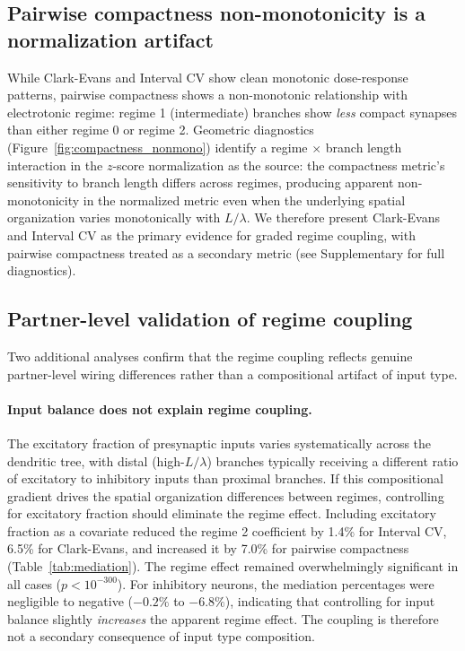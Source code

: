 \documentclass[11pt]{article}
\begin{document}
\subsection{Pairwise compactness non-monotonicity is a normalization artifact}
\label{sec:compactness}

While Clark-Evans and Interval CV show clean monotonic dose-response patterns, pairwise compactness shows a non-monotonic relationship with electrotonic regime: regime 1 (intermediate) branches show \textit{less} compact synapses than either regime 0 or regime 2. Geometric diagnostics (Figure~\ref{fig:compactness_nonmono}) identify a regime $\times$ branch length interaction in the $z$-score normalization as the source: the compactness metric's sensitivity to branch length differs across regimes, producing apparent non-monotonicity in the normalized metric even when the underlying spatial organization varies monotonically with $L/\lambda$. We therefore present Clark-Evans and Interval CV as the primary evidence for graded regime coupling, with pairwise compactness treated as a secondary metric (see Supplementary for full diagnostics).


\subsection{Partner-level validation of regime coupling}
\label{sec:partner_validation}

Two additional analyses confirm that the regime coupling reflects genuine partner-level wiring differences rather than a compositional artifact of input type.

\paragraph{Input balance does not explain regime coupling.} \label{sec:mediation_input} The excitatory fraction of presynaptic inputs varies systematically across the dendritic tree, with distal (high-$L/\lambda$) branches typically receiving a different ratio of excitatory to inhibitory inputs than proximal branches. If this compositional gradient drives the spatial organization differences between regimes, controlling for excitatory fraction should eliminate the regime effect. Including excitatory fraction as a covariate reduced the regime 2 coefficient by 1.4\% for Interval CV, 6.5\% for Clark-Evans, and increased it by 7.0\% for pairwise compactness (Table~\ref{tab:mediation}). The regime effect remained overwhelmingly significant in all cases ($p < 10^{-300}$). For inhibitory neurons, the mediation percentages were negligible to negative ($-0.2\%$ to $-6.8\%$), indicating that controlling for input balance slightly \textit{increases} the apparent regime effect. The coupling is therefore not a secondary consequence of input type composition.
\end{document}
